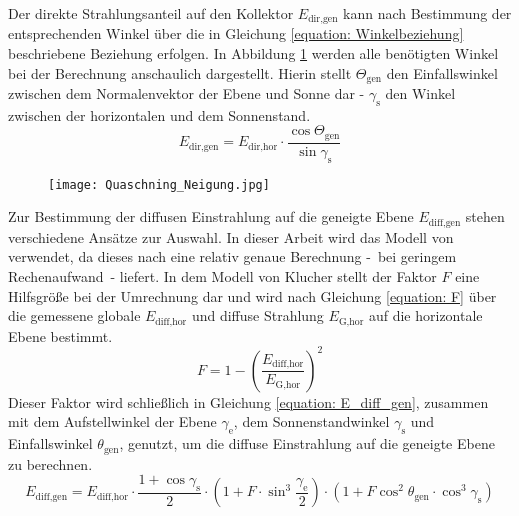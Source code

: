 Der direkte Strahlungsanteil auf den Kollektor $E_\text{dir,gen}$ kann nach Bestimmung der entsprechenden Winkel über die in Gleichung \ref{equation: Winkelbeziehung} beschriebene Beziehung erfolgen. In Abbildung \ref{fig: Sonneneinstrahlung auf geneigter und Horizontaler Ebene} werden alle benötigten Winkel bei der Berechnung anschaulich dargestellt. Hierin stellt $\Theta_\text{gen}$ den Einfallswinkel zwischen dem Normalenvektor der Ebene und Sonne dar - $\gamma_\text{s}$ den Winkel zwischen der horizontalen und dem Sonnenstand.
\begin{equation}\label{equation: Winkelbeziehung}
E_\text{dir,gen} = E_\text{dir,hor} \cdot \dfrac{\cos \Theta_\text{gen}}{\sin \gamma_\text{s}}
\end{equation}

\begin{figure}[ht]
	\centering
	\texttt{[image: Quaschning\_Neigung.jpg]}
	\label{fig: Sonneneinstrahlung auf geneigter und Horizontaler Ebene}
\end{figure}
Zur Bestimmung der diffusen Einstrahlung auf die geneigte Ebene $E_\text{diff,gen}$ stehen verschiedene Ansätze zur Auswahl. In dieser Arbeit wird das Modell von \citet{KLUCHER1979} verwendet, da dieses nach \citet{Quaschning2015} eine relativ genaue Berechnung -~bei geringem Rechenaufwand~- liefert. In dem Modell von Klucher stellt der Faktor $F$ eine Hilfsgröße bei der Umrechnung dar und wird nach Gleichung \ref{equation: F} über die gemessene globale $E_\text{diff,hor}$ und diffuse Strahlung $E_\text{G,hor}$ auf die horizontale Ebene bestimmt. 
\begin{equation}
\label{equation: F}
F = 1 - \left( \dfrac{E_\text{diff,hor}}{E_\text{G,hor}} \right)^2 
\end{equation}
Dieser Faktor wird schließlich in Gleichung \ref{equation: E_diff_gen}, zusammen mit dem Aufstellwinkel der Ebene $\gamma_\text{e}$, dem Sonnenstandwinkel $\gamma_\text{s}$ und Einfallswinkel $\theta_\text{gen}$, genutzt, um die diffuse Einstrahlung auf die geneigte Ebene zu berechnen.
\begin{equation}\label{equation: E_diff_gen}
E_\text{diff,gen} = E_\text{diff,hor} \cdot \dfrac{1 + \cos \gamma_\text{s}}{2} \cdot \left( 1 + F \cdot \sin^3 \dfrac{\gamma_\text{e}}{2} \right) \cdot (1 + F \cos^2 \theta_\text{gen} \cdot \cos^3 \gamma_\text{s})
\end{equation}
